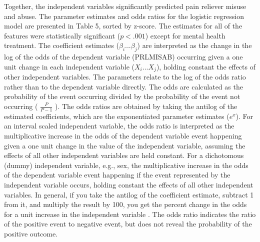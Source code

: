 \documentclass[sigconf]{acmart}
\begin{document}
Together, the independent variables significantly predicted pain reliever 
misuse and abuse. The parameter estimates and odds ratios for the logistic 
regression model are presented in Table 5, sorted by z-score. The estimates 
for all of the features were statistically significant ($p<.001$) except for 
mental health treatment. The coefficient estimates ($\beta_i$...$\beta_j$) 
are interpreted as the change in the log of the odds of the dependent variable 
(PRLMISAB) occurring given a one unit change in each independent variable
($X_i$...$X_j$), holding constant the effects of other independent variables. 
The parameters relate to the log of the odds ratio rather than to the dependent 
variable directly. The odds are calculated as the probability of the event 
occurring divided by the probability of the event not occurring 
( \(\frac{P}{P-1}\) ). The odds ratios are obtained by taking the antilog of 
the estimated coefficients, which are the exponentiated parameter estimates 
($e^x$). For an interval scaled independent variable, the odds ratio 
is interpreted as the multiplicative increase in the odds of the dependent 
variable event happening given a one unit change in the value of the 
independent variable, assuming the effects of all other independent variables 
are held constant. For a dichotomous (dummy) independent variable, e.g., sex, 
the multiplicative increase in the odds of the dependent variable event 
happening if the event represented by the independent variable occurs, holding 
constant the effects of all other independent variables. In general, if you 
take the antilog of the coefficient estimate, subtract 1 from it, and multiply 
the result by 100, you get the percent change in the odds for a unit increase 
in the independent variable  \cite{gujarati09}.  The odds ratio indicates the 
ratio of the positive event to negative event, but does not reveal the 
probability of the positive outcome.

\end{document}
